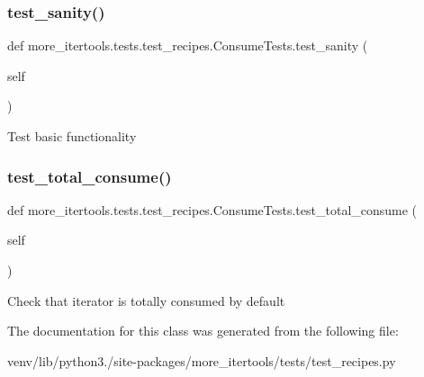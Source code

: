 \subsubsection{\texorpdfstring{test\+\_\+sanity()}{test\_sanity()}}
{\footnotesize\ttfamily def more\+\_\+itertools.\+tests.\+test\+\_\+recipes.\+Consume\+Tests.\+test\+\_\+sanity (\begin{DoxyParamCaption}\item[{}]{self }\end{DoxyParamCaption})}

\begin{DoxyVerb}Test basic functionality\end{DoxyVerb}
 \mbox{\label{classmore__itertools_1_1tests_1_1test__recipes_1_1_consume_tests_a7d7cecd36e3d3e31a99afe29ba41ff35}} 
\subsubsection{\texorpdfstring{test\+\_\+total\+\_\+consume()}{test\_total\_consume()}}
{\footnotesize\ttfamily def more\+\_\+itertools.\+tests.\+test\+\_\+recipes.\+Consume\+Tests.\+test\+\_\+total\+\_\+consume (\begin{DoxyParamCaption}\item[{}]{self }\end{DoxyParamCaption})}

\begin{DoxyVerb}Check that iterator is totally consumed by default\end{DoxyVerb}
 

The documentation for this class was generated from the following file\+:\begin{DoxyCompactItemize}
\item 
venv/lib/python3./site-\/packages/more\+\_\+itertools/tests/test\+\_\+recipes.\+py\end{DoxyCompactItemize}
